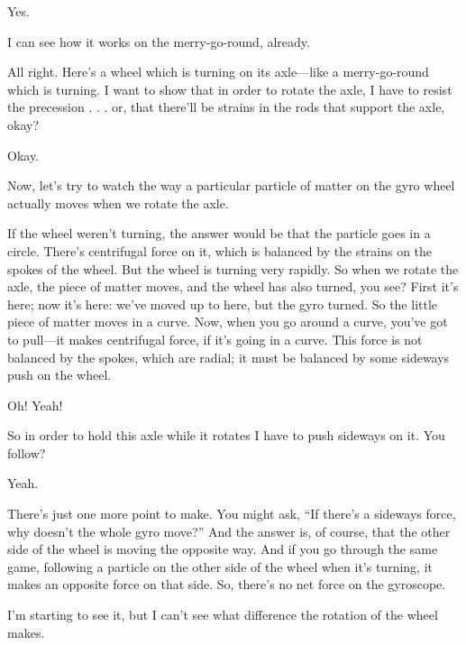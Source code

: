 \documentclass[11pt,oneside]{article}
\begin{document}
Yes.\par

I can see how it works on the merry-go-round, already.\par

All right. Here's a wheel which is turning on its axle---like a merry-go-round which is turning. I want to show that in order to rotate the axle, I have to resist the precession . . . or, that there'll be strains in the rods that support the axle, okay?\par

Okay.\par

Now, let's try to watch the way a particular particle of matter on the gyro wheel actually moves when we rotate the axle.\par

If the wheel weren't turning, the answer would be that the particle goes in a circle. There's centrifugal force on it, which is balanced by the strains on the spokes of the wheel. But the wheel is turning very rapidly. So when we rotate the axle, the piece of matter moves, and the wheel has also turned, you see? First it's here; now it's here: we've moved up to here, but the gyro turned. So the little piece of matter moves in a curve. Now, when you go around a curve, you've got to pull---it makes centrifugal force, if it's going in a curve. This force is not balanced by the spokes, which are radial; it must be balanced by some sideways push on the wheel.\par

Oh! Yeah!\par

So in order to hold this axle while it rotates I have to push sideways on it. You follow?\par

Yeah.\par

There's just one more point to make. You might ask, ``If there's a sideways force, why doesn't the whole gyro move?'' And the answer is, of course, that the other side of the wheel is moving the opposite way. And if you go through the same game, following a particle on the other side of the wheel when it's turning, it makes an opposite force on that side. So, there's no net force on the gyroscope.\par

I'm starting to see it, but I can't see what difference the rotation of the wheel makes.\par
\end{document}
